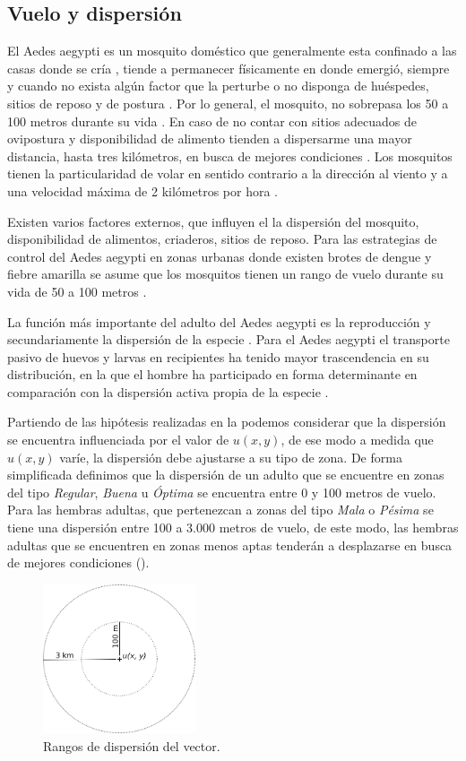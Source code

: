 
\subsection{Vuelo y dispersión}
\label{subsec:cap4-vuelo-dispersion}
El Aedes aegypti es un mosquito doméstico que generalmente esta confinado a las casas donde se
cría \cite{luevano1993ciclo}, tiende a permanecer físicamente en donde emergió, siempre y cuando
no exista algún factor que la perturbe o no disponga de huéspedes, sitios de reposo y de postura
\cite{ThironIzcazaJ2003}. Por lo general, el mosquito, no sobrepasa los 50 a 100 metros durante su
vida \cite{cabezas2005dengue}. En caso de no contar con sitios adecuados de ovipostura y
disponibilidad de alimento tienden a dispersarme una mayor distancia, hasta tres kilómetros, en
busca de mejores condiciones \cite{ThironIzcazaJ2003}. Los mosquitos tienen la particularidad de
volar en sentido contrario a la dirección al viento \cite{ThironIzcazaJ2003,web-site:speedAnimals}
y a una velocidad máxima de 2 kilómetros por hora \cite{web-site:speedAnimals,kaufmann2004flight}.

Existen varios factores externos, que influyen el la dispersión del mosquito, disponibilidad de
alimentos, criaderos, sitios de reposo. Para las estrategias de control del Aedes aegypti en zonas
urbanas donde existen brotes de dengue y fiebre amarilla se asume que los mosquitos tienen un
rango de vuelo durante su vida de 50 a 100 metros \cite{dengueUruguayCap8}.

La función más importante del adulto del Aedes aegypti es la reproducción y secundariamente la
dispersión de la especie \cite{ThironIzcazaJ2003}. Para el Aedes aegypti el transporte pasivo de
huevos y larvas en recipientes ha tenido mayor trascendencia en su distribución, en la que el
hombre ha participado en forma determinante en comparación con la dispersión activa propia de la
especie \citep{ThironIzcazaJ2003}.

Partiendo de las hipótesis realizadas en la  podemos considerar
que la dispersión se encuentra influenciada por el valor de $u(x,y)$, de ese modo a medida que
$u(x,y)$ varíe, la dispersión debe ajustarse a su tipo de zona. De forma simplificada definimos que
la dispersión de un adulto que se encuentre en zonas del tipo \textit{Regular}, \textit{Buena} u
\textit{Óptima} se encuentra entre 0 y 100 metros de vuelo. Para las hembras adultas, que
pertenezcan a zonas del tipo \textit{Mala} o \textit{Pésima} se tiene una dispersión entre 100 a
3.000 metros de vuelo, de este modo, las hembras adultas que se encuentren en zonas menos aptas
tenderán a desplazarse en busca de mejores condiciones ().

\begin{figure}[!hptb]
\centering
\includegraphics[width=0.4\textwidth]{capitulo-4/graphics/rango-vuelo.png}
\caption{\label{fig:cap4-dispersion} Rangos de dispersión del vector.}
\end{figure}
